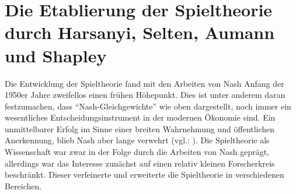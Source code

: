 \section{Die Etablierung der Spieltheorie durch Harsanyi, Selten, Aumann und Shapley}

Die Entwicklung der Spieltheorie fand mit den Arbeiten von Nash Anfang der 1950er Jahre zweifellos einen frühen Höhepunkt. Dies ist unter anderem daran festzumachen, dass "`Nash-Gleichgewichte"' wie oben dargestellt, noch immer ein wesentliches Entscheidungsinstrument in der modernen Ökonomie sind. Ein unmittelbarer Erfolg im Sinne einer breiten Wahrnehmung und öffentlichen Anerkennung, blieb Nash aber lange verwehrt (vgl.: \textcite{Nash2004}). Die Spieltheorie als Wissenschaft war zwar in der Folge durch die Arbeiten von Nash geprägt, allerdings war das Interesse zunächst auf einen relativ kleinen Forscherkreis beschränkt. Dieser verfeinerte und erweiterte die Spieltheorie in verschiedenen Bereichen. 

